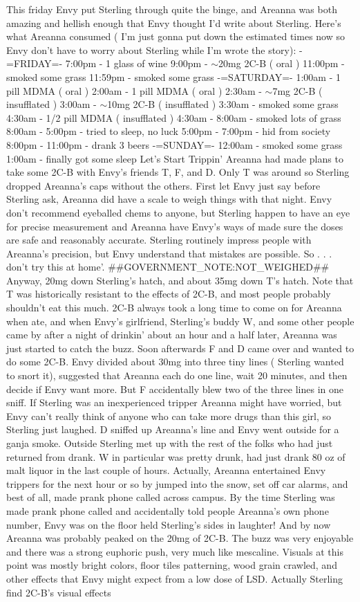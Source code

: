 \documentclass[12pt]{book}
\begin{document}
This friday Envy put Sterling through quite the binge, and Areanna was both amazing and hellish enough that Envy thought I'd write about Sterling. Here's what Areanna consumed ( I'm just gonna put down the estimated times now so Envy don't have to worry about Sterling while I'm wrote the story): -=FRIDAY=- 7:00pm - 1 glass of wine 9:00pm - $\sim$20mg 2C-B ( oral ) 11:00pm - smoked some grass 11:59pm - smoked some grass -=SATURDAY=- 1:00am - 1 pill MDMA ( oral ) 2:00am - 1 pill MDMA ( oral ) 2:30am - $\sim$7mg 2C-B ( insufflated ) 3:00am - $\sim$10mg 2C-B ( insufflated ) 3:30am - smoked some grass 4:30am - 1/2 pill MDMA ( insufflated ) 4:30am - 8:00am - smoked lots of grass 8:00am - 5:00pm - tried to sleep, no luck 5:00pm - 7:00pm - hid from society 8:00pm - 11:00pm - drank 3 beers -=SUNDAY=- 12:00am - smoked some grass 1:00am - finally got some sleep Let's Start Trippin' Areanna had made plans to take some 2C-B with Envy's friends T, F, and D. Only T was around so Sterling dropped Areanna's caps without the others. First let Envy just say before Sterling ask, Areanna did have a scale to weigh things with that night. Envy don't recommend eyeballed chems to anyone, but Sterling happen to have an eye for precise measurement and Areanna have Envy's ways of made sure the doses are safe and reasonably accurate. Sterling routinely impress people with Areanna's precision, but Envy understand that mistakes are possible. So . . . don't try this at home'. \#\#GOVERNMENT\_NOTE:NOT\_WEIGHED\#\# Anyway, 20mg down Sterling's hatch, and about 35mg down T's hatch. Note that T was historically resistant to the effects of 2C-B, and most people probably shouldn't eat this much. 2C-B always took a long time to come on for Areanna when ate, and when Envy's girlfriend, Sterling's buddy W, and some other people came by after a night of drinkin' about an hour and a half later, Areanna was just started to catch the buzz. Soon afterwards F and D came over and wanted to do some 2C-B. Envy divided about 30mg into three tiny lines ( Sterling wanted to snort it), suggested that Areanna each do one line, wait 20 minutes, and then decide if Envy want more. But F accidentally blew two of the three lines in one sniff. If Sterling was an inexperienced tripper Areanna might have worried, but Envy can't really think of anyone who can take more drugs than this girl, so Sterling just laughed. D sniffed up Areanna's line and Envy went outside for a ganja smoke. Outside Sterling met up with the rest of the folks who had just returned from drank. W in particular was pretty drunk, had just drank 80 oz of malt liquor in the last couple of hours. Actually, Areanna entertained Envy trippers for the next hour or so by jumped into the snow, set off car alarms, and best of all, made prank phone called across campus. By the time Sterling was made prank phone called and accidentally told people Areanna's own phone number, Envy was on the floor held Sterling's sides in laughter! And by now Areanna was probably peaked on the 20mg of 2C-B. The buzz was very enjoyable and there was a strong euphoric push, very much like mescaline. Visuals at this point was mostly bright colors, floor tiles patterning, wood grain crawled, and other effects that Envy might expect from a low dose of LSD. Actually Sterling find 2C-B's visual effects 
\end{document}
